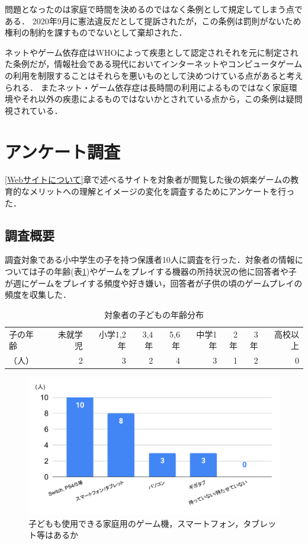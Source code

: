 \documentclass[12pt,a4j,titlepage]{ltjsarticle}
\begin{document}
問題となったのは家庭で時間を決めるのではなく条例として規定してしまう点である．
2020年9月に憲法違反だとして提訴されたが，この条例は罰則がないため権利の制約を課すものでないとして棄却された．

ネットやゲーム依存症はWHOによって疾患として認定されそれを元に制定された条例だが，情報社会である現代においてインターネットやコンピュータゲームの利用を制限することはそれらを悪いものとして決めつけている点があると考えられる．
またネット・ゲーム依存症は長時間の利用によるものではなく家庭環境やそれ以外の疾患によるものではないかとされている点から，この条例は疑問視されている．

\clearpage
\section{アンケート調査}\label{アンケート調査}
\ref{Webサイトについて}章で述べるサイトを対象者が閲覧した後の娯楽ゲームの教育的なメリットへの理解とイメージの変化を調査するためにアンケートを行った．

\subsection{調査概要}
調査対象である小中学生の子を持つ保護者10人に調査を行った．対象者の情報については子の年齢(表\ref{table:情報})やゲームをプレイする機器の所持状況の他に回答者や子が週にゲームをプレイする頻度や好き嫌い，回答者が子供の頃のゲームプレイの頻度を収集した．

\begin{table}[H]
 \caption{対象者の子どもの年齢分布}
 \label{table:情報}
 \small
 \centering
  \begin{tabular}{lrrrrrrrr}
  \hline
   子の年齢 & 未就学児 & 小学1,2年 & 3,4年 & 5,6年 & 中学1年 & 2年 & 3年 & 高校以上\\
   （人）& 2 & 3 & 2 & 4 & 3 & 1 & 2 & 0\\
   \hline
  \end{tabular}
\end{table}

\begin{figure}[H]
 \begin{center}
  \includegraphics[keepaspectratio, scale=0.4]{chart1.pdf}
 \end{center}
 \caption{子どもも使用できる家庭用のゲーム機，スマートフォン，タブレット等はあるか}
 \label{fig:ゲーム所持}
\end{figure}
\end{document}
